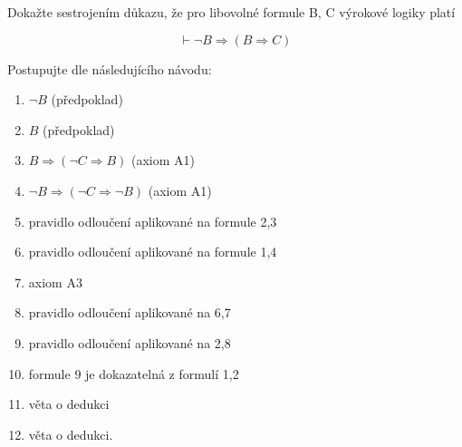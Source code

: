 Dokažte sestrojením důkazu, že pro libovolné formule B, C výrokové
logiky platí

$$\vdash \neg B \Rightarrow (B \Rightarrow C)$$

Postupujte dle následujícího návodu:
\begin{enumerate}
  \item $\neg B$ (předpoklad)
  \item $B$ (předpoklad)
  \item $B \Rightarrow ( \neg C \Rightarrow B)$ (axiom A1)
  \item $\neg B \Rightarrow ( \neg C \Rightarrow \neg B)$ (axiom A1)
  \item pravidlo odloučení aplikované na formule 2,3
  \item pravidlo odloučení aplikované na formule 1,4
  \item axiom A3
  \item pravidlo odloučení aplikované na 6,7
  \item pravidlo odloučení aplikované na 2,8
  \item formule 9 je dokazatelná z formulí 1,2
  \item věta o dedukci
  \item věta o dedukci.
\end{enumerate}
